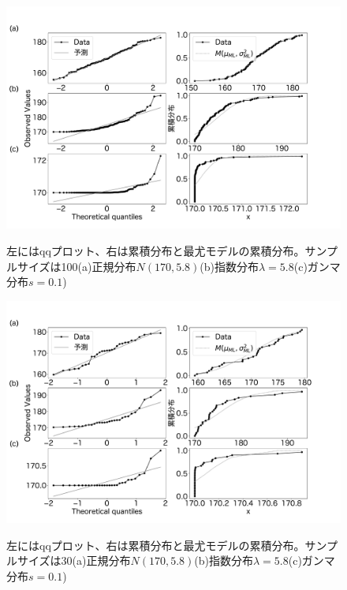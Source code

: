 \begin{figure}
    \begin{center}
        \includegraphics[width=15cm]{./image/12_/qq_cummlative_expon_norm_gamma.pdf}
        \label{fig:qq_cummlative}
        \caption{左にはqqプロット、右は累積分布と最尤モデルの累積分布。サンプルサイズは100(a)正規分布$N(170,5.8)$(b)指数分布$\lambda=5.8$(c)ガンマ分布$s=0.1$)}
    \end{center}
\end{figure}

\begin{figure}
    \begin{center}
        \includegraphics[width=15cm]{./image/12_/qq_cummlative_expon_norm_gammaN_30.pdf}
        \label{fig:qq_cummlative_30}
        \caption{左にはqqプロット、右は累積分布と最尤モデルの累積分布。サンプルサイズは30(a)正規分布$N(170,5.8)$(b)指数分布$\lambda=5.8$(c)ガンマ分布$s=0.1$)}
    \end{center}
\end{figure}

